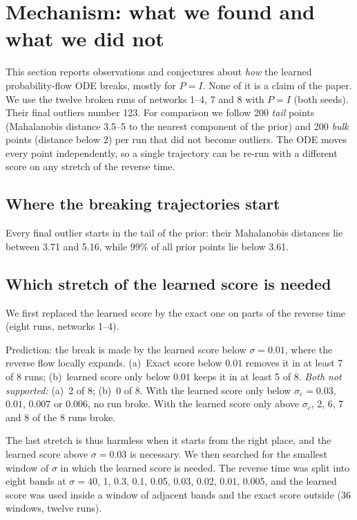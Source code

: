 \section{Mechanism: what we found and what we did not}
\label{sec:mechanism}

This section reports observations and conjectures about \emph{how} the learned probability-flow ODE breaks, mostly for $P=I$.
None of it is a claim of the paper.
We use the twelve broken runs of networks 1--4, 7 and 8 with $P=I$ (both seeds).
Their final outliers number 123.
For comparison we follow 200 \emph{tail} points (Mahalanobis distance 3.5--5 to the nearest component of the prior) and 200 \emph{bulk} points (distance below 2) per run that did not become outliers.
The ODE moves every point independently, so a single trajectory can be re-run with a different score on any stretch of the reverse time.

\subsection{Where the breaking trajectories start}

\begin{observation}
\label{obs:tail}
Every final outlier starts in the tail of the prior: their Mahalanobis distances lie between 3.71 and 5.16, while 99\% of all prior points lie below 3.61.
\end{observation}

\subsection{Which stretch of the learned score is needed}

We first replaced the learned score by the exact one on parts of the reverse time (eight runs, networks 1--4).

\begin{test}
\label{test:h3}
Prediction: the break is made by the learned score below $\sigma=0.01$, where the reverse flow locally expands.
(a)~Exact score below $0.01$ removes it in at least 7 of 8 runs; (b)~learned score only below $0.01$ keeps it in at least 5 of 8.
\emph{Both not supported:} (a)~2 of 8; (b)~0 of 8.
With the learned score only below $\sigma_c=0.03$, $0.01$, $0.007$ or $0.006$, no run broke.
With the learned score only above $\sigma_c$, 2, 6, 7 and 8 of the 8 runs broke.
\end{test}

The last stretch is thus harmless when it starts from the right place, and the learned score above $\sigma=0.03$ is necessary.
We then searched for the smallest window of $\sigma$ in which the learned score is needed.
The reverse time was split into eight bands at $\sigma=40$, 1, 0.3, 0.1, 0.05, 0.03, 0.02, 0.01, 0.005, and the learned score was used inside a window of adjacent bands and the exact score outside (36 windows, twelve runs).

